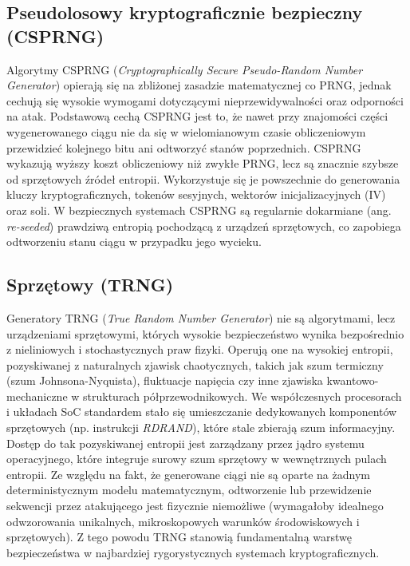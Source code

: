\documentclass{article}
\begin{document}
\subsection{Pseudolosowy kryptograficznie bezpieczny (CSPRNG)}
Algorytmy CSPRNG (\textit{Cryptographically Secure Pseudo-Random Number Generator}) opierają się na zbliżonej zasadzie matematycznej co PRNG, jednak cechują się wysokie wymogami dotyczącymi nieprzewidywalności oraz odporności na atak. Podstawową cechą CSPRNG jest to, że nawet przy znajomości części wygenerowanego ciągu nie da się w wielomianowym czasie obliczeniowym przewidzieć kolejnego bitu ani odtworzyć stanów poprzednich.
CSPRNG wykazują wyższy koszt obliczeniowy niż zwykłe PRNG, lecz są znacznie szybsze od sprzętowych źródeł entropii. Wykorzystuje się je powszechnie do generowania kluczy kryptograficznych, tokenów sesyjnych, wektorów inicjalizacyjnych (IV) oraz soli. W bezpiecznych systemach CSPRNG są regularnie dokarmiane (ang. \textit{re-seeded}) prawdziwą entropią pochodzącą z urządzeń sprzętowych, co zapobiega odtworzeniu stanu ciągu w przypadku jego wycieku.
\subsection{Sprzętowy (TRNG)}
Generatory TRNG (\textit{True Random Number Generator}) nie są algorytmami, lecz urządzeniami sprzętowymi, których wysokie bezpieczeństwo wynika bezpośrednio z nieliniowych i stochastycznych praw fizyki. Operują one na wysokiej entropii, pozyskiwanej z naturalnych zjawisk chaotycznych, takich jak szum termiczny (szum Johnsona-Nyquista), fluktuacje napięcia czy inne zjawiska kwantowo-mechaniczne w strukturach półprzewodnikowych. We współczesnych procesorach i układach SoC standardem stało się umieszczanie dedykowanych komponentów sprzętowych (np. instrukcji \textit{RDRAND}), które stale zbierają szum informacyjny.
Dostęp do tak pozyskiwanej entropii jest zarządzany przez jądro systemu operacyjnego, które integruje surowy szum sprzętowy w wewnętrznych pulach entropii. Ze względu na fakt, że generowane ciągi nie są oparte na żadnym deterministycznym modelu matematycznym, odtworzenie lub przewidzenie sekwencji przez atakującego jest fizycznie niemożliwe (wymagałoby idealnego odwzorowania unikalnych, mikroskopowych warunków środowiskowych i sprzętowych). Z tego powodu TRNG stanowią fundamentalną warstwę bezpieczeństwa w najbardziej rygorystycznych systemach kryptograficznych.
\end{document}
